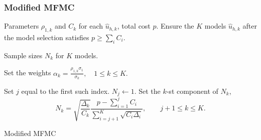 \documentclass{beamer}
\begin{document}
\begin{frame}[t]
    \frametitle{Modified MFMC}

    
    \begin{algorithm}[H]
    {\fontsize{8}{8}\selectfont 
    \begin{algorithmic}[1]

    \REQUIRE Parameters $\rho_{1,k}$ and $C_k$ for each $\widehat u_{h, k}$, total cost $p$. Ensure the $K$ models $\widehat u_{h, k}$ after the model selection satisfies $p\ge \sum_i C_i$.

    \ENSURE Sample sizes $N_k$ for $K$ models.

    \vspace{2mm}
    
    \STATE Set the weights $\alpha_k = \frac{\rho_{1,k}\sigma_1}{\sigma_k}, \quad 1\le k\le K.$

    
    \STATE  Set $j$ equal to the first such index.
    \STATE  $N_j\gets 1$. 
    \STATE  Set the $k$-st component of $N_k$,
            \[
            N_{k} = \sqrt{\frac{\Delta_{k}}{C_{k}}}\frac{p-\sum_{i=1}^j C_i}{\sum_{i=j+1}^{K} \sqrt{C_i\Delta_i}}, \qquad j+1\le k\le K.
            \]
    \ENDWHILE
    
    \end{algorithmic}
    \caption{Modified MFMC}
    }
    \end{algorithm}
    
\end{frame}
\end{document}
